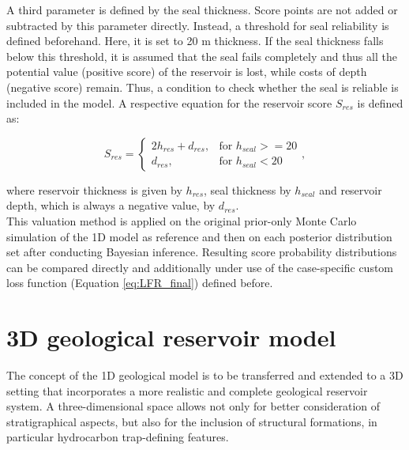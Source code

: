 	        A third parameter is defined by the seal thickness. Score points are not added or subtracted by this parameter directly. Instead, a threshold for seal reliability is defined beforehand. Here, it is set to 20 m thickness. If the seal thickness falls below this threshold, it is assumed that the seal fails completely and thus all the potential value (positive score) of the reservoir is lost, while costs of depth (negative score) remain. Thus, a condition to check whether the seal is reliable is included in the model. A respective equation for the reservoir score $S_{res}$ is defined as:
			
			\begin{equation}\label{eq:1D_score_system}
			S_{res} = 
			\begin{cases}
			2h_{res} + d_{res}, & \text{for } h_{seal} >= 20  \\
			d_{res}, & \text{for } h_{seal} < 20
			\end{cases},
			\end{equation}
			
			where reservoir thickness is given by $h_{res}$, seal thickness by $h_{seal}$ and reservoir depth, which is always a negative value, by $d_{res}$.\\
			This valuation method is applied on the original prior-only Monte Carlo simulation of the 1D model as reference and then on each posterior distribution set after conducting Bayesian inference. Resulting score probability distributions can be compared directly and additionally under use of the case-specific custom loss function (Equation \ref{eq:LFR_final}) defined before. 
		
		\section{3D geological reservoir model}\label{sec:3D_model}
		The concept of the 1D geological model is to be transferred and extended to a 3D setting that incorporates a more realistic and complete geological reservoir system. A three-dimensional space allows not only for better consideration of stratigraphical aspects, but also for the inclusion of structural formations, in particular hydrocarbon trap-defining features.
		
